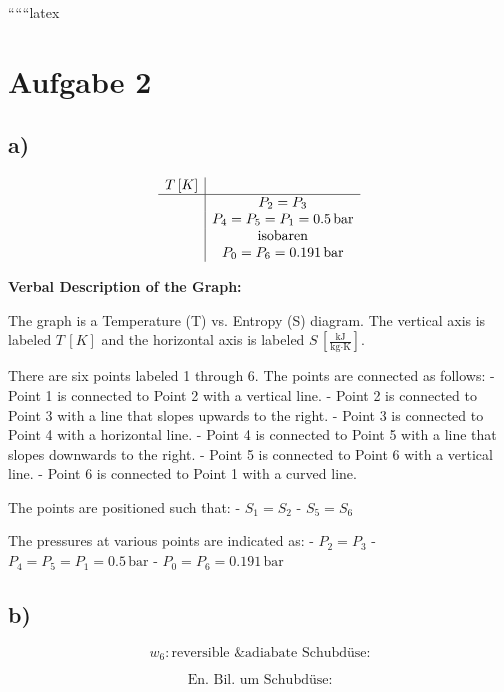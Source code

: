 
``````latex


\section*{Aufgabe 2}

\subsection*{a)}

\[
\begin{array}{c}
\begin{array}{c|c}
T \, [K] & \\
\hline
& P_2 = P_3 \\
& P_4 = P_5 = P_1 = 0.5 \, \text{bar} \\
& \text{isobaren} \\
& P_0 = P_6 = 0.191 \, \text{bar} \\
\end{array}
\end{array}
\]

\noindent
\textbf{Verbal Description of the Graph:}

The graph is a Temperature (T) vs. Entropy (S) diagram. The vertical axis is labeled \( T \, [K] \) and the horizontal axis is labeled \( S \, \left[ \frac{\text{kJ}}{\text{kg} \cdot \text{K}} \right] \). 

There are six points labeled 1 through 6. The points are connected as follows:
- Point 1 is connected to Point 2 with a vertical line.
- Point 2 is connected to Point 3 with a line that slopes upwards to the right.
- Point 3 is connected to Point 4 with a horizontal line.
- Point 4 is connected to Point 5 with a line that slopes downwards to the right.
- Point 5 is connected to Point 6 with a vertical line.
- Point 6 is connected to Point 1 with a curved line.

The points are positioned such that:
- \( S_1 = S_2 \)
- \( S_5 = S_6 \)

The pressures at various points are indicated as:
- \( P_2 = P_3 \)
- \( P_4 = P_5 = P_1 = 0.5 \, \text{bar} \)
- \( P_0 = P_6 = 0.191 \, \text{bar} \)

\subsection*{b)}

\[
w_6: \text{reversible \& adiabate Schubdüse:}
\]

\[
\text{En. Bil. um Schubdüse:}
\]

